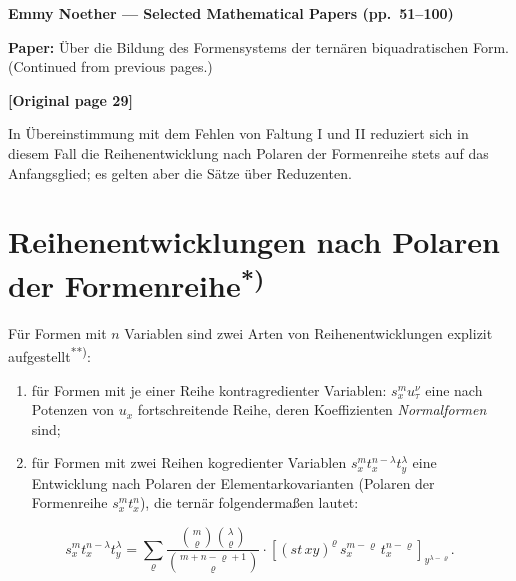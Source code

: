 \documentclass[12pt,a4paper]{article}
\begin{document}
\renewenvironment{noetherpaper}[4]{\newpage\section*{#1}\addcontentsline{toc}{section}{#1}\par\smallskip}{\par\medskip}


\begin{center}
\Large\textbf{Emmy Noether --- Selected Mathematical Papers (pp.~51--100)}
\end{center}

\vspace{1em}
\noindent\textbf{Paper:} Über die Bildung des Formensystems der ternären biquadratischen Form.
(Continued from previous pages.)

\vspace{1em}


\noindent\textbf{[Original page 29]}

In Übereinstimmung mit dem Fehlen von Faltung I und II reduziert
sich in diesem Fall die Reihenentwicklung nach Polaren der Formenreihe
stets auf das Anfangsglied; es gelten aber die Sätze über Reduzenten.

\section{Reihenentwicklungen nach Polaren der Formenreihe\textsuperscript{*)}}

Für Formen mit $n$ Variablen sind zwei Arten von Reihenentwicklungen
explizit aufgestellt\textsuperscript{**)}:
\begin{enumerate}
\item für Formen mit je einer Reihe kontragredienter Variablen:
$s_x^m u_\tau^\nu$ eine nach Potenzen von $u_x$ fortschreitende Reihe, deren Koeffizienten
\textit{Normalformen} sind;
\item für Formen mit zwei Reihen kogredienter Variablen
$s_x^m t_x^{n-\lambda} t_y^\lambda$
eine Entwicklung nach Polaren der Elementarkovarianten (Polaren der
Formenreihe $s_x^m t_x^n$), die ternär folgendermaßen lautet:
\end{enumerate}

\begin{equation}\tag{I.}
s_x^m t_x^{n-\lambda} t_y^\lambda = \sum_\varrho \frac{\binom{m}{\varrho}\binom{\lambda}{\varrho}}{\binom{m+n-\varrho+1}{\varrho}} \cdot [(st\,\widehat{xy})^\varrho \, s_x^{m-\varrho} \, t_x^{n-\varrho}]_{y^{\lambda-\varrho}}.
\end{equation}
\end{document}
